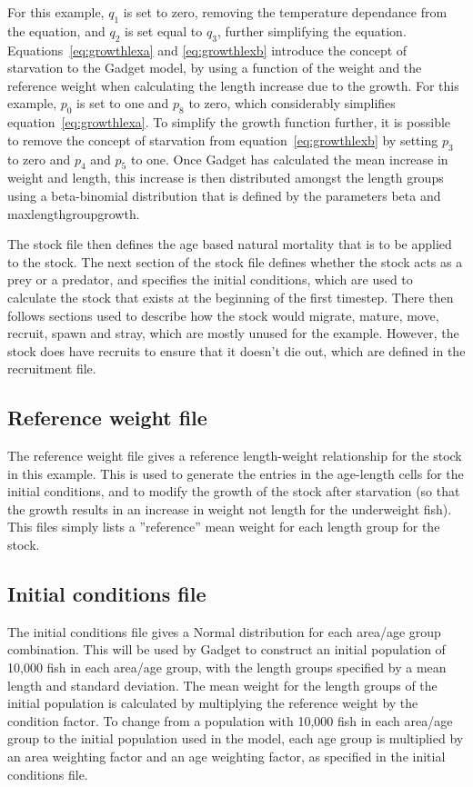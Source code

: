 \documentclass[10pt,titlepage]{article}
\begin{document}
\bigskip
For this example, $q_1$ is set to zero, removing the temperature dependance from the equation, and $q_2$ is set equal to $q_3$, further simplifying the equation.  Equations~\ref{eq:growthlexa} and \ref{eq:growthlexb} introduce the concept of starvation to the Gadget model, by using a function of the weight and the reference weight when calculating the length increase due to the growth.  For this example, $p_0$ is set to one and $p_8$ to zero, which considerably simplifies equation~\ref{eq:growthlexa}.  To simplify the growth function further, it is possible to remove the concept of starvation from equation~\ref{eq:growthlexb} by setting $p_3$ to zero and $p_4$ and $p_5$ to one.  Once Gadget has calculated the mean increase in weight and length, this increase is then distributed amongst the length groups using a beta-binomial distribution that is defined by the parameters beta and maxlengthgroupgrowth.

\bigskip
The stock file then defines the age based natural mortality that is to be applied to the stock.  The next section of the stock file defines whether the stock acts as a prey or a predator, and specifies the initial conditions, which are used to calculate the stock that exists at the beginning of the first timestep.  There then follows sections used to describe how the stock would migrate, mature, move, recruit, spawn and stray, which are mostly unused for the example.  However, the stock does have recruits to ensure that it doesn't die out, which are defined in the recruitment file.

{\small }

\subsection{Reference weight file}
The reference weight file gives a reference length-weight relationship for the stock in this example.  This is used to generate the entries in the age-length cells for the initial conditions, and to modify the growth of the stock after starvation (so that the growth results in an increase in weight not length for the underweight fish).  This files simply lists a ''reference'' mean weight for each length group for the stock.

{\small }

\subsection{Initial conditions file}
The initial conditions file gives a Normal distribution for each area/age group combination.  This will be used by Gadget to construct an initial population of 10,000 fish in each area/age group, with the length groups specified by a mean length and standard deviation.  The mean weight for the length groups of the initial population is calculated by multiplying the reference weight by the condition factor.  To change from a population with 10,000 fish in each area/age group to the initial population used in the model, each age group is multiplied by an area weighting factor and an age weighting factor, as specified in the initial conditions file.
\end{document}
